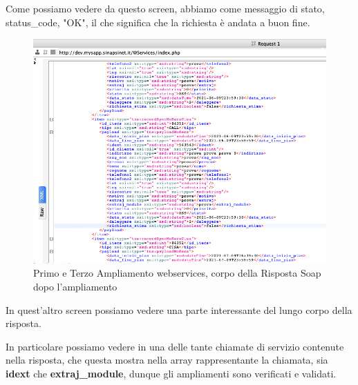 \begin{flushleft}
	Come possiamo vedere da questo screen, abbiamo come messaggio di stato, \\status\_code, "OK", il che significa che la richiesta è andata a buon fine.
\end{flushleft}
\newpage
\begin{figure}[!h] 
	\centering
	\includegraphics[scale = 0.5]{immagini/webservices/ampliamenti/accettazione/3ampl__risposta_soap_singola-chiamata.png}
	\caption{Primo e Terzo Ampliamento webservices, corpo della Risposta Soap dopo l'ampliamento}
\end{figure}

\begin{flushleft}
	In quest'altro screen possiamo vedere una parte interessante del lungo corpo della risposta.
	\newspace
	
	In particolare possiamo vedere in una delle tante chiamate di servizio contenute nella risposta, che questa mostra nella array rappresentante la chiamata, sia \textbf{idext} che \textbf{extraj\_module}, dunque gli ampliamenti sono verificati e validati.
\end{flushleft}